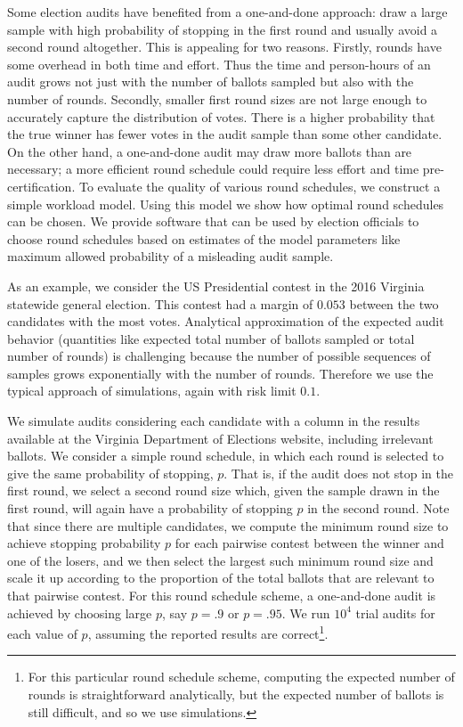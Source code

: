 Some election audits have benefited from a one-and-done approach: draw a large sample with high probability of stopping in the first round and usually avoid a second round altogether. This is appealing for two reasons. Firstly, rounds have some overhead in both time and effort. Thus the time and person-hours of an audit grows not just with the number of ballots sampled but also with the number of rounds. Secondly, smaller first round sizes are not large enough to accurately capture the distribution of votes. There is a higher probability that the true winner has fewer votes in the audit sample than some other candidate. On the other hand, a one-and-done audit may draw more ballots than are necessary; a more efficient round schedule could require less effort and time pre-certification. To evaluate the quality of various round schedules, we construct a simple workload model. Using this model we show how optimal round schedules can be chosen. We provide software that can be used by election officials to choose round schedules based on estimates of the model parameters like maximum allowed probability of a misleading audit sample.

As an example, we consider the US Presidential contest in the 2016 Virginia statewide general election. This contest had a margin of $0.053$ between the two candidates with the most votes.
Analytical approximation of the expected audit behavior (quantities like expected total number of ballots sampled or total number of rounds) is challenging because the number of possible sequences of samples grows exponentially with the number of rounds. 
Therefore we use the typical approach of simulations, again with risk limit $0.1$.

We simulate audits considering each candidate with a column in the results available at the Virginia Department of Elections website, including irrelevant ballots.
We consider a simple round schedule, in which each round is selected to give the same probability of stopping, $p$. That is, if the audit does not stop in the first round, we select a second round size which, given the sample drawn in the first round, will again have a probability of stopping $p$ in the second round. Note that since there are multiple candidates, we compute the minimum round size to achieve stopping probability $p$ for each pairwise contest between the winner and one of the losers, and we then select the largest such minimum round size and scale it up according to the proportion of the total ballots that are relevant to that pairwise contest. For this round schedule scheme, a one-and-done audit is achieved by choosing large $p$, say $p=.9$ or $p=.95$. We run $10^4$ trial audits for each value of $p$, assuming the reported results are correct\footnote{For this particular round schedule scheme, computing the expected number of rounds is straightforward analytically, but the expected number of ballots is still difficult, and so we use simulations.}. 

